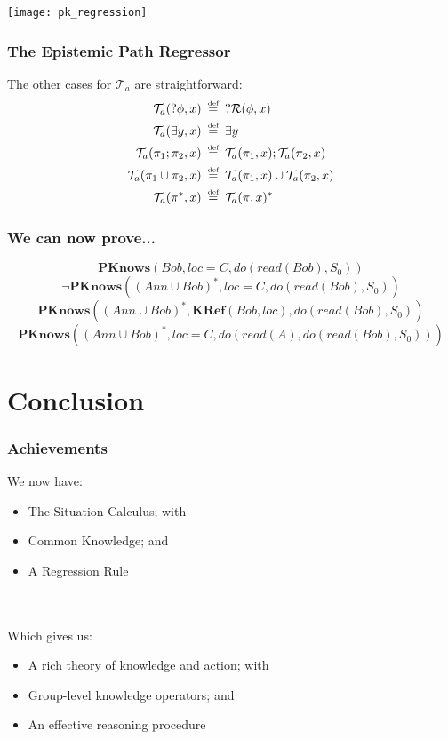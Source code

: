 \documentclass[compress]{beamer}
\newcommand{\isdef}{\hbox{$\stackrel{\mbox{\tiny def}}{=}$}}
\newcommand{\Reg}{\mathcal{R}}
\newcommand{\Trn}{\mathcal{T}}
\newcommand{\TrnA}{\Trn_{a}}
\newcommand{\PKnows}{\mathbf{PKnows}}
\begin{document}
\begin{frame}
\begin{center}
  \texttt{[image: pk\_regression]}
\end{center}
\end{frame}

\begin{frame}
\frametitle{The Epistemic Path Regressor}
The other cases for $\TrnA$ are straightforward:
\begin{align*}
\TrnA(?\phi,x) & \,\,\,\isdef\,\,\,?\Reg(\phi,x) \\
\TrnA(\exists y,x) & \,\,\,\isdef\,\,\,\exists y \\
\TrnA(\pi_1 ; \pi_2,x) & \,\,\,\isdef\,\,\,\TrnA(\pi_1,x) ; \TrnA(\pi_2,x) \\
\TrnA(\pi_1 \cup \pi_2,x) & \,\,\,\isdef\,\,\,\TrnA(\pi_1,x) \cup \TrnA(\pi_2,x) \\
\TrnA(\pi^*,x) & \,\,\,\isdef\,\,\,\TrnA(\pi,x)^*
\end{align*}
\end{frame}

\begin{frame}
\frametitle{We can now prove...}
\begin{equation*}
\PKnows(Bob,loc = C,do(read(Bob),S_0))
\end{equation*}
\pause
\begin{equation*}
\neg\PKnows((Ann \cup Bob)^*,loc = C,do(read(Bob),S_0))
\end{equation*}
\pause
\begin{equation*}
\PKnows((Ann \cup Bob)^*,\mathbf{KRef}(Bob,loc),do(read(Bob),S_0))
\end{equation*}
\pause
\begin{equation*}
\PKnows((Ann \cup Bob)^*,loc = C,do(read(A), do(read(Bob),S_0)))
\end{equation*}
\end{frame}

\section{Conclusion}

\begin{frame}
\frametitle{Achievements}
We now have:
\begin{itemize}
\item The Situation Calculus; with
\item Common Knowledge; and
\item A Regression Rule
\end{itemize}
\ \\
\ \\
\pause
Which gives us:
\begin{itemize}
\item A rich theory of knowledge and action; with
\item Group-level knowledge operators; and
\item An effective reasoning procedure
\end{itemize}
\end{frame}
\end{document}
